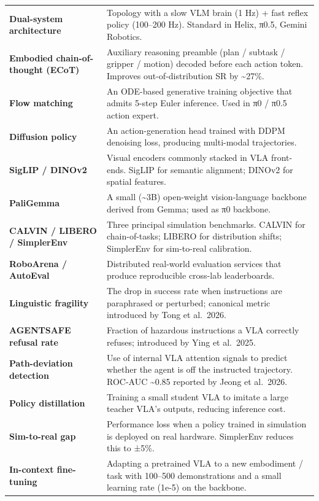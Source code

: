 {\begin{longtable}[]{@{}
  >{\raggedright\arraybackslash}p{}
  >{\raggedright\arraybackslash}p{}@{}}
\textbf{Dual-system architecture} & Topology with a slow VLM brain (1 Hz) + fast reflex policy (100--200 Hz). Standard in Helix, π0.5, Gemini Robotics. \\
\textbf{Embodied chain-of-thought (ECoT)} & Auxiliary reasoning preamble (plan / subtask / gripper / motion) decoded before each action token. Improves out-of-distribution SR by \textasciitilde27\%. \\
\textbf{Flow matching} & An ODE-based generative training objective that admits 5-step Euler inference. Used in π0 / π0.5 action expert. \\
\textbf{Diffusion policy} & An action-generation head trained with DDPM denoising loss, producing multi-modal trajectories. \\
\textbf{SigLIP / DINOv2} & Visual encoders commonly stacked in VLA front-ends. SigLIP for semantic alignment; DINOv2 for spatial features. \\
\textbf{PaliGemma} & A small (\textasciitilde3B) open-weight vision-language backbone derived from Gemma; used as π0 backbone. \\
\textbf{CALVIN / LIBERO / SimplerEnv} & Three principal simulation benchmarks. CALVIN for chain-of-tasks; LIBERO for distribution shifts; SimplerEnv for sim-to-real calibration. \\
\textbf{RoboArena / AutoEval} & Distributed real-world evaluation services that produce reproducible cross-lab leaderboards. \\
\textbf{Linguistic fragility} & The drop in success rate when instructions are paraphrased or perturbed; canonical metric introduced by Tong et al.~2026. \\
\textbf{AGENTSAFE refusal rate} & Fraction of hazardous instructions a VLA correctly refuses; introduced by Ying et al.~2025. \\
\textbf{Path-deviation detection} & Use of internal VLA attention signals to predict whether the agent is off the instructed trajectory. ROC-AUC \textasciitilde0.85 reported by Jeong et al.~2026. \\
\textbf{Policy distillation} & Training a small student VLA to imitate a large teacher VLA's outputs, reducing inference cost. \\
\textbf{Sim-to-real gap} & Performance loss when a policy trained in simulation is deployed on real hardware. SimplerEnv reduces this to ±5\%. \\
\textbf{In-context fine-tuning} & Adapting a pretrained VLA to a new embodiment / task with 100--500 demonstrations and a small learning rate (1e-5) on the backbone. \\
\end{longtable}
}

